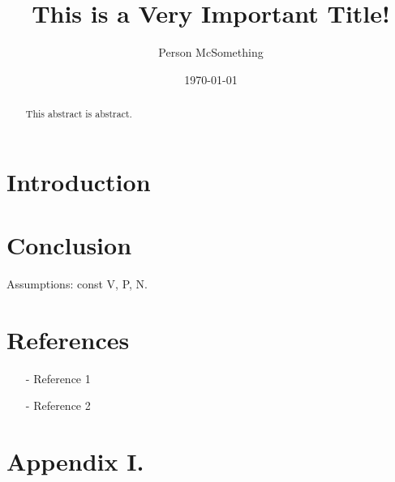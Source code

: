 \documentclass[reprint,english,notitlepage]{revtex4-1}  %
\begin{document}
\title{This is a Very Important Title!}   %
\author{Person McSomething}               %
\date{\today}                             %
\noaffiliation                            %
\begin{abstract}                          %
This abstract is abstract.                %
\end{abstract}                            %
\maketitle                                %


\section{Introduction}






\section{Conclusion}
Assumptions: const V, P, N.



\section*{References}  %
\begin{itemize}
\item[-]Reference 1
\item[-]Reference 2
\end{itemize}

\newpage
\appendix
\section*{Appendix I.}
\end{document}
